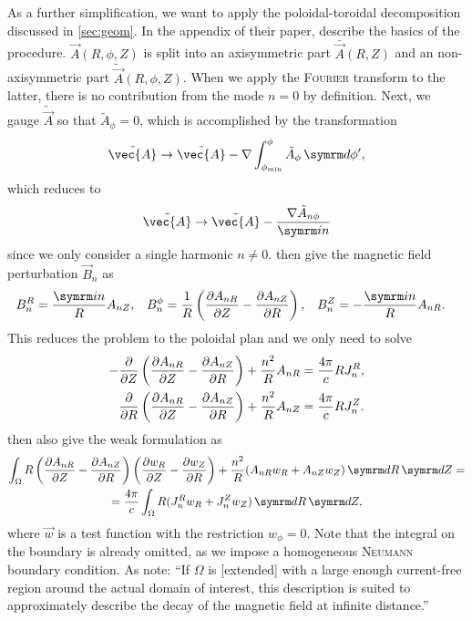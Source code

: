 As a further simplification, we want to apply the poloidal-toroidal decomposition discussed in \cref{sec:geom}. In the appendix of their paper, \textcite{Heyn08} describe the basics of the procedure. $\vec{A} (R, \phi, Z)$ is split into an axisymmetric part $\bar{\vec{A}} (R, Z)$ and an non-axisymmetric part $\tilde{\vec{A}} (R, \phi, Z)$. When we apply the \textsc{Fourier} transform to the latter, there is no contribution from the mode $n = 0$ by definition. Next, we gauge $\tilde{\vec{A}}$ so that $\tilde{A}_{\phi} = 0$, which is accomplished by the transformation
\begin{gather}
  \tilde{\vec{A}} \to \tilde{\vec{A}} - \grad \int_{\phi_{\min}}^{\phi} \tilde{A}_{\phi} \, \diff \phi',
\end{gather}
which reduces to
\begin{gather}
  \tilde{\vec{A}} \to \tilde{\vec{A}} - \frac{\grad \tilde{A}_{n \phi}}{\im n}
\end{gather}
since we only consider a single harmonic $n \neq 0$. \Textcite{Albert16} then give the magnetic field perturbation $\vec{B}_{n}$ as
\begin{align}
  B_{n}^{R} &= \frac{\im n}{R} A_{n Z}, & B_{n}^{\phi} &= \frac{1}{R} \left ( \pd[A_{n R}]{Z} - \pd[A_{n Z}]{R} \right ), & B_{n}^{Z} &= -\frac{\im n}{R} A_{n R}.
\end{align}
This reduces the problem to the poloidal plan and we only need to solve
\begin{align}
  -\pd{Z} \left ( \pd[A_{n R}]{Z} - \pd[A_{n Z}]{R} \right ) + \frac{n^{2}}{R} A_{n R} &= \frac{4 \pi}{c} R J_{n}^{R}, \\
  \pd{R} \left ( \pd[A_{n R}]{Z} - \pd[A_{n Z}]{R} \right ) + \frac{n^{2}}{R} A_{n Z} &= \frac{4 \pi}{c} R J_{n}^{Z}.
\end{align}
\Textcite{Albert16} then also give the weak formulation as
\begin{multline}
  \int_{\Omega} R \left ( \pd[A_{n R}]{Z} - \pd[A_{n Z}]{R} \right ) \left ( \pd[w_{R}]{Z} - \pd[w_{Z}]{R} \right ) + \frac{n^{2}}{R} (A_{n R} w_{R} + A_{n Z} w_{Z}) \, \diff R \, \diff Z = \\ = \frac{4 \pi}{c} \int_{\Omega} R (J_{n}^{R} w_{R} + J_{n}^{Z} w_{Z}) \, \diff R \, \diff Z,
\end{multline}
where $\vec{w}$ is a test function with the restriction $w_{\phi} = 0$. Note that the integral on the boundary is already omitted, as we impose a homogeneous \textsc{Neumann} boundary condition. As \textcite{Albert16} note: \enquote{If $\Omega$ is [extended] with a large enough current-free region around the actual domain of interest, this description is suited to approximately describe the decay of the magnetic field at infinite distance.}

